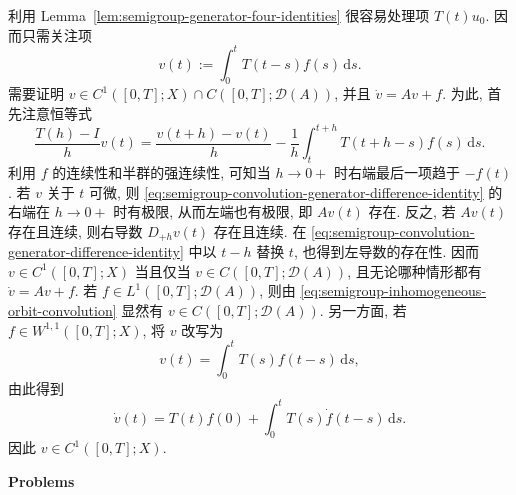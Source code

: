\begin{Proof}
利用 Lemma~\ref{lem:semigroup-generator-four-identities} 很容易处理项 $T(t)u_0$. 因而只需关注项
\begin{equation}\label{eq:semigroup-inhomogeneous-orbit-convolution}
v(t):=\int_0^t T(t-s)f(s)\,\mathrm{d}s.
\end{equation}
需要证明 $v\in C^1([0,T];X)\cap C([0,T];\mathcal{D}(A))$, 并且 $\dot v=Av+f$. 为此, 首先注意恒等式
\begin{equation}\label{eq:semigroup-convolution-generator-difference-identity}
\dfrac{T(h)-I}{h}v(t)=\dfrac{v(t+h)-v(t)}{h}-\dfrac{1}{h}\int_t^{t+h}T(t+h-s)f(s)\,\mathrm{d}s.
\end{equation}
利用 $f$ 的连续性和半群的强连续性, 可知当 $h\to0+$ 时右端最后一项趋于 $-f(t)$. 若 $v$ 关于 $t$ 可微, 则 \eqref{eq:semigroup-convolution-generator-difference-identity} 的右端在 $h\to0+$ 时有极限, 从而左端也有极限, 即 $Av(t)$ 存在. 反之, 若 $Av(t)$ 存在且连续, 则右导数 $D_{+h}v(t)$ 存在且连续. 在 \eqref{eq:semigroup-convolution-generator-difference-identity} 中以 $t-h$ 替换 $t$, 也得到左导数的存在性. 因而 $v\in C^1([0,T];X)$ 当且仅当 $v\in C([0,T];\mathcal{D}(A))$, 且无论哪种情形都有 $\dot v=Av+f$. 若 $f\in L^1([0,T];\mathcal{D}(A))$, 则由 \eqref{eq:semigroup-inhomogeneous-orbit-convolution} 显然有 $v\in C([0,T];\mathcal{D}(A))$. 另一方面, 若 $f\in W^{1,1}([0,T];X)$, 将 $v$ 改写为
\begin{equation}\label{eq:semigroup-convolution-time-variable-reversal}
v(t)=\int_0^t T(s)f(t-s)\,\mathrm{d}s,
\end{equation}
由此得到
\begin{equation}\label{eq:semigroup-convolution-with-differentiable-data}
\dot v(t)=T(t)f(0)+\int_0^t T(s)\dot f(t-s)\,\mathrm{d}s.
\end{equation}
因此 $v\in C^1([0,T];X)$.
\end{Proof}

\textbf{Problems}

